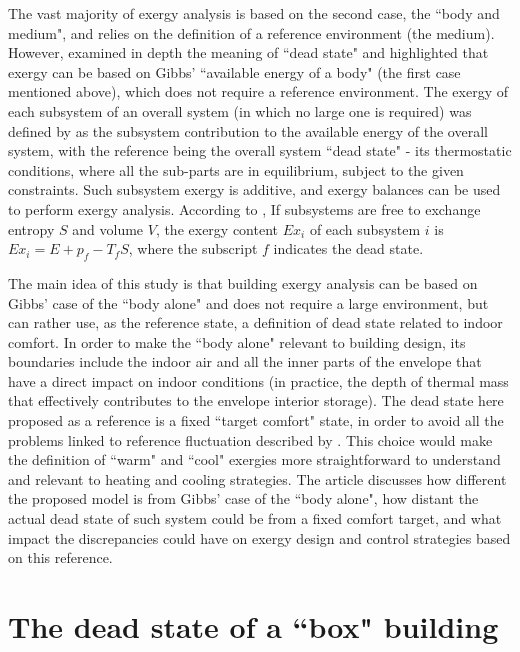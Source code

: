 \documentclass[10pt]{extarticle} %
\begin{document}
The vast majority of exergy analysis is based on the second case, the  ``body and medium", and relies on the definition of a reference environment (the medium). However, \cite{Gaggioli2012} examined in depth the meaning of ``dead state" and highlighted that exergy can be based on Gibbs' ``available energy of a body" (the first case mentioned above), which does not require a reference environment. The exergy of each subsystem of an overall system (in which no large one is required) was defined by \cite{Gaggioli1998} as the subsystem contribution to the available energy of the overall system, with the reference being the overall system ``dead state" - its thermostatic conditions, where all the sub-parts are in equilibrium, subject to the given constraints. Such subsystem exergy is additive, and exergy balances can be used to perform exergy analysis. According to \cite{Gaggioli2012}, If subsystems are free to exchange entropy $S$ and volume $V$, the exergy content $Ex_i$ of each subsystem $i$ is $Ex_i = E + p_f - T_fS$, where the subscript $f$ indicates the dead state.

The main idea of this study is that building exergy analysis can be based on Gibbs' case of the ``body alone" and does not require a large environment, but can rather use, as the reference state, a definition of dead state related to indoor comfort. In order to make the ``body alone" relevant to building design, its boundaries include the indoor air and all the inner parts of the envelope that have a direct impact on indoor conditions (in practice, the depth of thermal mass that effectively contributes to the envelope interior storage). The dead state here proposed as a reference is a fixed ``target comfort" state, in order to avoid all the problems linked to reference fluctuation described by \cite{Pons2009}. This choice would make the definition of ``warm" and ``cool" exergies more straightforward to understand and relevant to heating and cooling strategies. The article discusses how different the proposed model is from Gibbs' case of the ``body alone", how distant the actual dead state of such system could be from a fixed comfort target, and what impact the discrepancies could have on exergy design and control strategies based on this reference.

\section{The dead state of a ``box" building} \label{subsec:simple}
\end{document}
